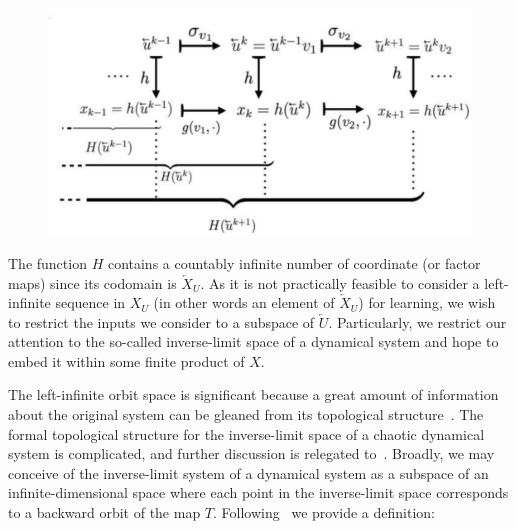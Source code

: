 \begin{figure}[ht]
  \includegraphics[scale=0.4]{Graphs/_actionofh_H.eps}
  \centering
 \label{fig:actionh_H}
\end{figure}

The function $H$ contains a countably infinite number of coordinate (or factor maps) since its codomain is $\overleftarrow{X}_U$.  
As it is not practically feasible to consider a left-infinite sequence in $X_U$ (in other words an element of  $\overleftarrow{X}_U$) for learning, we wish to restrict the inputs we consider to a subspace of $\overleftarrow{U}$. 
Particularly, we restrict our attention to the  so-called inverse-limit space of a dynamical system and hope to embed it within some finite product of $X$. 


The left-infinite orbit space is significant because a great amount of information about the original system can be gleaned from its topological structure~\cite{ingram2011inverse,Manju_IEEE}. 
The formal topological structure for the inverse-limit space of a chaotic dynamical system is complicated, and further discussion is relegated to~\cite{kennedy2008inverse_limit, ingram2011inverse}.
Broadly, we may conceive of the inverse-limit system of a dynamical system as a subspace of an infinite-dimensional space where each point in the inverse-limit space corresponds to a backward orbit of the map $T$. 
Following~\cite{manjunath2021universal, ingram2011inverse} we provide a definition:

